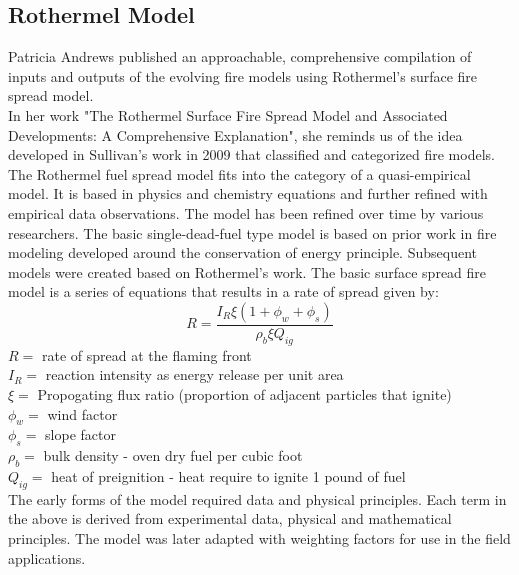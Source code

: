 \documentclass{article}
\begin{document}
\subsection{Rothermel Model}
Patricia Andrews\supercite{andrews} published an approachable, comprehensive compilation of inputs and outputs of the evolving fire models using Rothermel's\supercite{rothermel} surface fire spread model. \\
In her work "The Rothermel Surface Fire Spread Model and Associated Developments: A Comprehensive Explanation", she reminds us of the idea developed in Sullivan's\supercite{sullivan} work in 2009\cite{sullivan} that classified and categorized fire models. The Rothermel fuel spread model fits into the category of a quasi-empirical model.  It is based in physics and chemistry equations and further refined with empirical data observations. The model has been refined over time by various researchers. The basic single-dead-fuel type model is based on prior work in fire modeling developed around the conservation of energy principle. Subsequent models were created based on Rothermel's work. The basic surface spread fire model is a series of equations that results in a rate of spread given by:
$$R=\frac{I_R\xi(1+\phi_w+\phi_s)}{\rho_b\xi Q_{ig}}$$
$R=$ rate of spread at the flaming front\\
$I_R=$ reaction intensity as energy release per unit area\\
$\xi=$ Propogating flux ratio (proportion of adjacent particles that ignite)\\
$\phi_w=$ wind factor\\
$\phi_s=$ slope factor\\
$\rho_b=$ bulk density - oven dry fuel per cubic foot\\
$Q_{ig}=$ heat of preignition - heat require to ignite 1 pound of fuel\\
The early forms of the model required data and physical principles.  Each term in the above is derived from experimental data, physical and mathematical principles.  The model was later adapted with weighting factors for use in the field applications.\\
\end{document}
